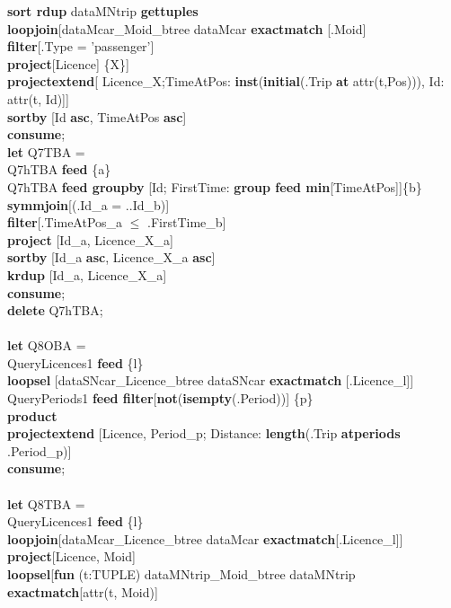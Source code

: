\documentclass[a4paper]{article}
\newcommand{\op}[1]{\textbf{#1}}
\begin{document}
\begin{scriptsize}
\begin{tabbing}
\>\>\>\>\op{sort rdup} dataMNtrip \op{gettuples}\\
\>\>\op{loopjoin}[dataMcar\_Moid\_btree dataMcar \op{exactmatch} [.Moid]\\
\>\>\>\op{filter}[.Type = 'passenger']\\
\>\>\>\op{project}[Licence] \{X\}]\\
\>\>\op{projectextend}[ Licence\_X;TimeAtPos: \op{inst}(\op{initial}(.Trip \op{at} attr(t,Pos))), Id: attr(t, Id)]]\\
\>\op{sortby} [Id \op{asc}, TimeAtPos \op{asc}]\\
\op{consume};\\
\op{let} Q7TBA =\\
\>Q7hTBA \op{feed} \{a\}\\
\>Q7hTBA \op{feed groupby} [Id; FirstTime: \op{group feed min}[TimeAtPos]]\{b\}\\
\>\op{symmjoin}[(.Id\_a = ..Id\_b)]\\
\>\op{filter}[.TimeAtPos\_a $\leq$ .FirstTime\_b]\\
\>\op{project} [Id\_a, Licence\_X\_a]\\
\>\op{sortby} [Id\_a \op{asc}, Licence\_X\_a \op{asc}]\\
\>\op{krdup} [Id\_a, Licence\_X\_a]\\
\op{consume};\\
\op{delete} Q7hTBA;\\
\\
\op{let} Q8OBA =\\
\>QueryLicences1 \op{feed} \{l\}\\
\>\>\op{loopsel} [dataSNcar\_Licence\_btree dataSNcar \op{exactmatch}
[.Licence\_l]]\\
\>QueryPeriods1 \op{feed filter}[\op{not}(\op{isempty}(.Period))] \{p\}\\
\>\op{product}\\
\>\op{projectextend} [Licence, Period\_p; Distance: \op{length}(.Trip
\op{atperiods} .Period\_p)]\\
\op{consume};\\
\\
\op{let} Q8TBA =\\
\>QueryLicences1 \op{feed} \{l\}\\
\>\>\op{loopjoin}[dataMcar\_Licence\_btree dataMcar
\op{exactmatch}[.Licence\_l]]\\
\>\>\op{project}[Licence, Moid]\\
\>\>\op{loopsel}[\op{fun} (t:TUPLE) dataMNtrip\_Moid\_btree dataMNtrip
\op{exactmatch}[attr(t, Moid)]\\

\end{tabbing}
\end{scriptsize}
\end{document}
